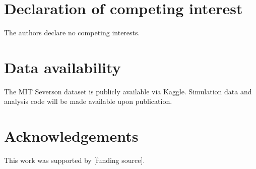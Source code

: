 \documentclass[preprint,12pt]{elsarticle}
\begin{document}
\section*{Declaration of competing interest}
The authors declare no competing interests.

\section*{Data availability}
The MIT Severson dataset is publicly available via Kaggle.
Simulation data and analysis code will be made available upon publication.

\section*{Acknowledgements}
This work was supported by [funding source].



\end{document}
